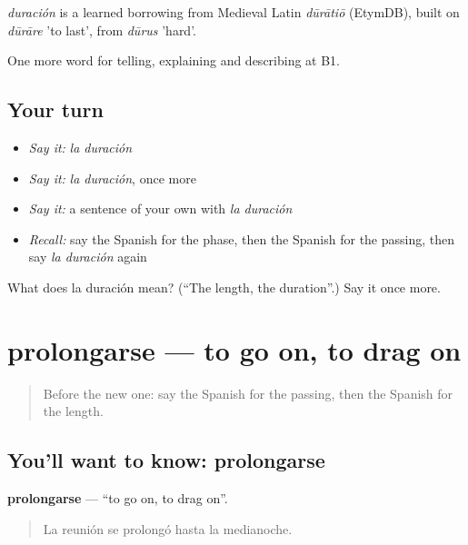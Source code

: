 \begin{cousinweb}
\emph{duración} is a learned borrowing from Medieval Latin \emph{dūrātiō} (EtymDB), built on \emph{dūrāre} 'to last', from \emph{dūrus} 'hard'.
\end{cousinweb}

\begin{grammarlens}[title={What you've built}]
One more word for telling, explaining and describing at B1.
\end{grammarlens}

\subsection*{Your turn}
\begin{itemize}
\raggedright
  \item \emph{Say it:} \emph{la duración}
  \item \emph{Say it:} \emph{la duración}, once more
  \item \emph{Say it:} a sentence of your own with \emph{la duración}
  \item \emph{Recall:} say the Spanish for the phase, then the Spanish for the passing, then say \emph{la duración} again
\end{itemize}

\begin{tcolorbox}[breakable,colback=teal!4,colframe=teal!35!black,title={Before you move on}]
What does la duración mean? (\textquotedblleft{}The length, the duration\textquotedblright{}.) Say it once more.
\end{tcolorbox}
\section[prolongarse]{prolongarse — to go on, to drag on}

\label{lesson:ES-C541-prolongarse}



\begin{quote}
Before the new one: say the Spanish for the passing, then the Spanish for the length.
\end{quote}

\subsection*{You'll want to know: prolongarse}
\textbf{prolongarse} — \textquotedblleft{}to go on, to drag on\textquotedblright{}.

\begin{quote}
La reunión se prolongó hasta la medianoche.
\end{quote}

